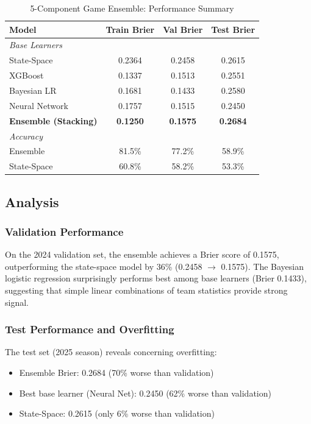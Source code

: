 \begin{table}[htbp]
\centering
\caption{5-Component Game Ensemble: Performance Summary}
\label{tab:game-ensemble-results}
\begin{tabular}{lccc}
\toprule
\textbf{Model} & \textbf{Train Brier} & \textbf{Val Brier} & \textbf{Test Brier} \\
\midrule
\textit{Base Learners} & & & \\
State-Space & 0.2364 & 0.2458 & 0.2615 \\
XGBoost & 0.1337 & 0.1513 & 0.2551 \\
Bayesian LR & 0.1681 & 0.1433 & 0.2580 \\
Neural Network & 0.1757 & 0.1515 & 0.2450 \\
\midrule
\textbf{Ensemble (Stacking)} & \textbf{0.1250} & \textbf{0.1575} & \textbf{0.2684} \\
\midrule
\textit{Accuracy} & & & \\
Ensemble & 81.5\% & 77.2\% & 58.9\% \\
State-Space & 60.8\% & 58.2\% & 53.3\% \\
\bottomrule
\end{tabular}
\end{table}

\subsection{Analysis}

\subsubsection{Validation Performance}

On the 2024 validation set, the ensemble achieves a Brier score of 0.1575, outperforming the state-space model by 36\% (0.2458 $\to$ 0.1575). The Bayesian logistic regression surprisingly performs best among base learners (Brier 0.1433), suggesting that simple linear combinations of team statistics provide strong signal.

\subsubsection{Test Performance and Overfitting}

The test set (2025 season) reveals concerning overfitting:

\begin{itemize}
    \item Ensemble Brier: 0.2684 (70\% worse than validation)
    \item Best base learner (Neural Net): 0.2450 (62\% worse than validation)
    \item State-Space: 0.2615 (only 6\% worse than validation)
\end{itemize}

